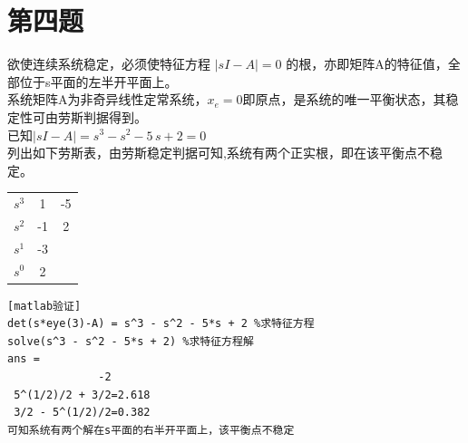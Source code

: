 \documentclass{article}
\begin{document}
\section*{第四题}
欲使连续系统稳定，必须使特征方程 $|sI-A|=0$ 的根，亦即矩阵A的特征值，全部位于s平面的左半开平面上。\\
系统矩阵A为非奇异线性定常系统，$x_{e}=0$即原点，是系统的唯一平衡状态，其稳定性可由劳斯判据得到。\\
已知$|sI-A|=s^3 - s^2 - 5\, s + 2 =0 $ \\
列出如下劳斯表，由劳斯稳定判据可知,系统有两个正实根，即在该平衡点不稳定。
\begin{table}[!h]
\centering
\begin{tabular}{c  c  c}  
$s^{3}$ & 1 & -5 \\ 
$s^{2}$ & -1 & 2 \\ 
$s^{1}$ & -3 & \\ 
$s^{0}$ & 2 & 
\end{tabular}
\end{table}

\begin{verbatim}[matlab验证] 
det(s*eye(3)-A) = s^3 - s^2 - 5*s + 2 %求特征方程
solve(s^3 - s^2 - 5*s + 2) %求特征方程解 
ans =
              -2
 5^(1/2)/2 + 3/2=2.618
 3/2 - 5^(1/2)/2=0.382
可知系统有两个解在s平面的右半开平面上，该平衡点不稳定
\end{verbatim}
\end{document}
